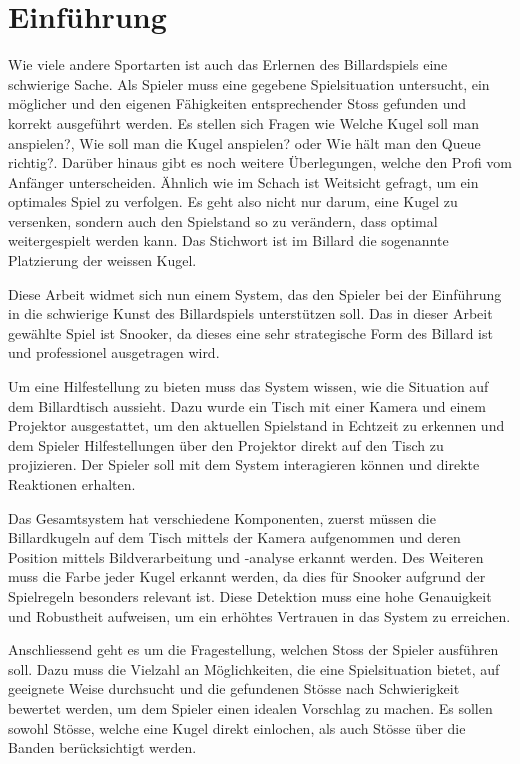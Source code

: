\chapter{Einführung}
Wie viele andere Sportarten ist auch das Erlernen des Billardspiels eine schwierige Sache.
Als Spieler muss eine gegebene Spielsituation untersucht, ein möglicher und den eigenen Fähigkeiten entsprechender Stoss
gefunden und korrekt ausgeführt werden.
Es stellen sich Fragen wie \glqq Welche Kugel soll man anspielen?\grqq{},
\glqq Wie soll man die Kugel anspielen?\grqq{} oder \glqq Wie hält man den Queue richtig?\grqq{}.
Darüber hinaus gibt es noch weitere Überlegungen, welche den Profi vom Anfänger unterscheiden.
Ähnlich wie im Schach ist Weitsicht gefragt, um ein optimales Spiel zu verfolgen.
Es geht also nicht nur darum, eine Kugel zu versenken, sondern auch den Spielstand so zu verändern,
dass optimal weitergespielt werden kann.
Das Stichwort ist im Billard die sogenannte Platzierung der weissen Kugel.

Diese Arbeit widmet sich nun einem System, das den Spieler bei der Einführung in die schwierige Kunst des Billardspiels unterstützen soll.
Das in dieser Arbeit gewählte Spiel ist Snooker, da dieses eine sehr strategische Form des Billard ist und professionel ausgetragen wird.

Um eine Hilfestellung zu bieten muss das System wissen, wie die Situation auf dem Billardtisch aussieht.
Dazu wurde ein Tisch mit einer Kamera und einem Projektor ausgestattet, um den aktuellen Spielstand in Echtzeit
zu erkennen und dem Spieler Hilfestellungen über den Projektor direkt auf den Tisch zu projizieren.
Der Spieler soll mit dem System interagieren können und direkte Reaktionen erhalten.

Das Gesamtsystem hat verschiedene Komponenten, zuerst müssen die Billardkugeln auf dem Tisch mittels der Kamera
aufgenommen und deren Position mittels Bildverarbeitung und -analyse erkannt werden.
Des Weiteren muss die Farbe jeder Kugel erkannt werden, da dies für Snooker aufgrund der Spielregeln besonders relevant ist.
Diese Detektion muss eine hohe Genauigkeit und Robustheit aufweisen, um ein erhöhtes Vertrauen in das System zu erreichen.

Anschliessend geht es um die Fragestellung, welchen Stoss der Spieler ausführen soll.
Dazu muss die Vielzahl an Möglichkeiten, die eine Spielsituation bietet, auf geeignete Weise durchsucht und die gefundenen
Stösse nach Schwierigkeit bewertet werden, um dem Spieler einen idealen Vorschlag zu machen.
Es sollen sowohl Stösse, welche eine Kugel direkt einlochen, als auch Stösse über die Banden berücksichtigt werden.

